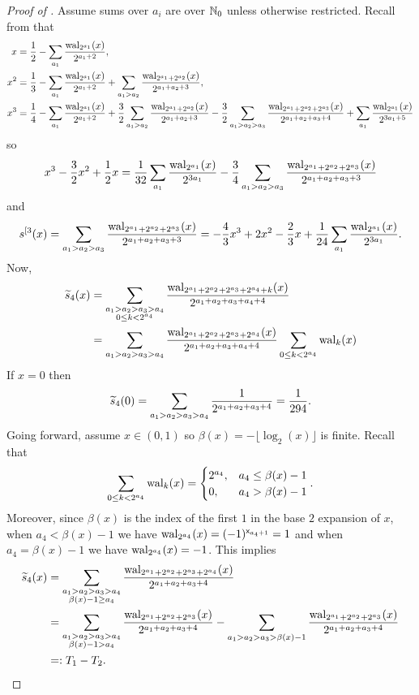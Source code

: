 \documentclass[acmsmall]{acmart}
\begin{document}
\begin{proof}[Proof of ]
    Assume sums over $a_i$ are over ${\mathbb{N}}_0$ unless otherwise restricted. Recall from  that
    \begin{align*}
        x &= \frac{1}{2} - \sum_{a_1} \frac{\mathrm{wal}_{2^{a_1}}(x)}{2^{a_1+2}}, \\
        x^2 &= \frac{1}{3} - \sum_{a_1}\frac{\mathrm{wal}_{2^{a_1}}(x)}{2^{a_1+2}} + \sum_{a_1>a_2} \frac{\mathrm{wal}_{2^{a_1}+2^{a_2}}(x)}{2^{a_1+a_2+3}}, \\
        x^3 &= \frac{1}{4} - \sum_{a_1} \frac{\mathrm{wal}_{2^{a_1}}(x)}{2^{a_1+2}} + \frac{3}{2}\sum_{a_1>a_2} \frac{\mathrm{wal}_{2^{a_1}+2^{a_2}}(x)}{2^{a_1+a_2+3}} - \frac{3}{2} \sum_{a_1>a_2>a_3} \frac{\mathrm{wal}_{2^{a_1}+2^{a_2}+2^{a_3}}(x)}{2^{a_1+a_2+a_3+4}} + \sum_{a_1} \frac{\mathrm{wal}_{2^{a_1}}(x)}{2^{3a_1+5}}
    \end{align*}
    so
    $$x^3-\frac{3}{2}x^2+\frac{1}{2}x = \frac{1}{32} \sum_{a_1} \frac{\mathrm{wal}_{2^{a_1}}(x)}{2^{3a_1}} - \frac{3}{4} \sum_{a_1>a_2>a_3} \frac{\mathrm{wal}_{2^{a_1}+2^{a_2}+2^{a_3}}(x)}{2^{a_1+a_2+a_3+3}}$$
    and 
    $$s^{[3}(x) = \sum_{a_1>a_2>a_3} \frac{\mathrm{wal}_{2^{a_1}+2^{a_2}+2^{a_3}}(x)}{2^{a_1+a_2+a_3+3}} = -\frac{4}{3} x^3+ 2x^2 -\frac{2}{3}x + \frac{1}{24} \sum_{a_1} \frac{\mathrm{wal}_{2^{a_1}}(x)}{2^{3a_1}}.$$
    Now,
    \begin{align*}
        {\widetilde{s}}_4(x) &= \sum_{\substack{a_1>a_2>a_3>a_4 \\ 0 \leq k < 2^{a_4}}} \frac{\mathrm{wal}_{2^{a_1}+2^{a_2}+2^{a_3}+2^{a_4}+k}(x)}{2^{a_1+a_2+a_3+a_4+4}} \\
        &= \sum_{a_1>a_2>a_3>a_4} \frac{\mathrm{wal}_{2^{a_1}+2^{a_2}+2^{a_3}+2^{a_4}}(x)}{2^{a_1+a_2+a_3+a_4+4}} \sum_{0 \leq k < 2^{a_4}} \mathrm{wal}_k(x) \\
    \end{align*}
    If $x=0$ then 
    $${\widetilde{s}}_4(0) = \sum_{a_1 > a_2 > a_3 > a_4} \frac{1}{2^{a_1+a_2+a_3+4}} = \frac{1}{294}.$$ 
    Going forward, assume $x \in (0,1)$ so $\beta(x) = - \lfloor \log_2(x) \rfloor$ is finite. Recall that 
    $$\sum_{0 \leq k < 2^{a_4}} \mathrm{wal}_k(x) = \begin{cases} 2^{a_4}, & a_4 \leq \beta(x)-1 \\ 0, & a_4 > \beta(x)-1 \end{cases}.$$
    Moreover, since $\beta(x)$ is the index of the first $1$ in the base $2$ expansion of $x$, when $a_4 < \beta(x)-1$ we have $\mathrm{wal}_{2^{a_4}}(x) = (-1)^{{\mathsf{x}}_{a_4+1}} = 1$ and when $a_4 = \beta(x)-1$ we have $\mathrm{wal}_{2^{a_4}}(x) = -1$. This implies 
    \begin{align*}
        {\widetilde{s}}_4(x) &= \sum_{\substack{a_1>a_2>a_3>a_4 \\ \beta(x)-1 \geq a_4}} \frac{\mathrm{wal}_{2^{a_1}+2^{a_2}+2^{a_3}+2^{a_4}}(x)}{2^{a_1+a_2+a_3+4}} \\
        &= \sum_{\substack{a_1>a_2>a_3>a_4 \\ \beta(x)-1 > a_4}} \frac{\mathrm{wal}_{2^{a_1}+2^{a_2}+2^{a_3}}(x)}{2^{a_1+a_2+a_3+4}} - \sum_{a_1>a_2 > a_3 > \beta(x)-1} \frac{\mathrm{wal}_{2^{a_1}+2^{a_2}+2^{a_3}}(x)}{2^{a_1+a_2+a_3+4}} \\
        &=: T_1 - T_2.
    \end{align*}
    

\end{proof}
\end{document}
